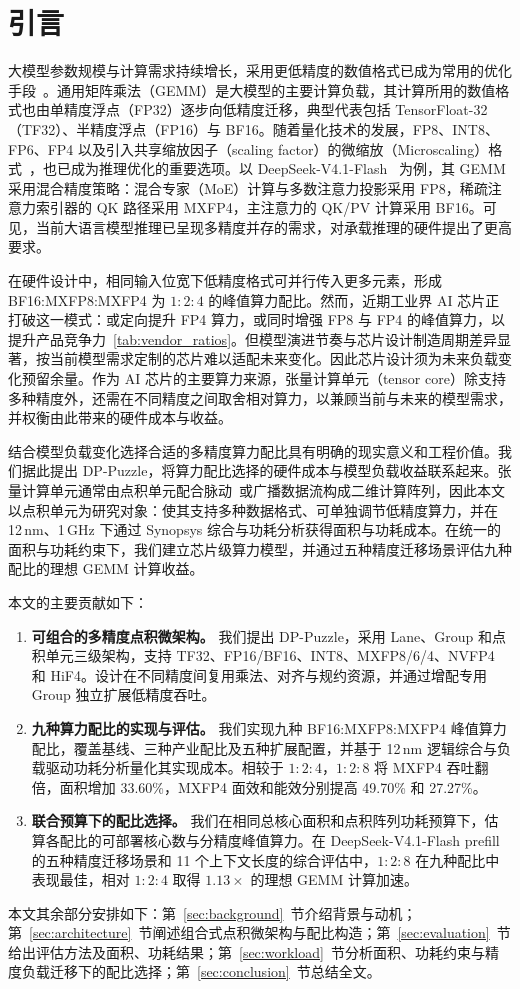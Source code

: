 \section{引言}
\label{sec:introduction}
大模型参数规模与计算需求持续增长，采用更低精度的数值格式已成为常用的优化手段~\cite{deepseekv3}。通用矩阵乘法（GEMM）是大模型的主要计算负载，其计算所用的数值格式也由单精度浮点（FP32）逐步向低精度迁移，典型代表包括 TensorFloat-32（TF32）、半精度浮点（FP16）与 BF16。随着量化技术的发展，FP8、INT8、FP6、FP4 以及引入共享缩放因子（scaling factor）的微缩放（Microscaling）格式~\cite{ocpmx2023}，也已成为推理优化的重要选项。以 DeepSeek-V4.1-Flash~\cite{deepseekv41source} 为例，其 GEMM 采用混合精度策略：混合专家（MoE）计算与多数注意力投影采用 FP8，稀疏注意力索引器的 QK 路径采用 MXFP4，主注意力的 QK/PV 计算采用 BF16。可见，当前大语言模型推理已呈现多精度并存的需求，对承载推理的硬件提出了更高要求。

在硬件设计中，相同输入位宽下低精度格式可并行传入更多元素，形成 BF16:MXFP8:MXFP4 为 $1:2:4$ 的峰值算力配比。然而，近期工业界 AI 芯片正打破这一模式：或定向提升 FP4 算力，或同时增强 FP8 与 FP4 的峰值算力，以提升产品竞争力~\ref{tab:vendor_ratios}。但模型演进节奏与芯片设计制造周期差异显著，按当前模型需求定制的芯片难以适配未来变化。因此芯片设计须为未来负载变化预留余量。作为 AI 芯片的主要算力来源，张量计算单元（tensor core）除支持多种精度外，还需在不同精度之间取舍相对算力，以兼顾当前与未来的模型需求，并权衡由此带来的硬件成本与收益。

结合模型负载变化选择合适的多精度算力配比具有明确的现实意义和工程价值。我们据此提出 DP-Puzzle，将算力配比选择的硬件成本与模型负载收益联系起来。张量计算单元通常由点积单元配合脉动~\cite{jouppi2017tpu}或广播数据流构成二维计算阵列，因此本文以点积单元为研究对象：使其支持多种数据格式、可单独调节低精度算力，并在 12\,nm、1\,GHz 下通过 Synopsys 综合与功耗分析获得面积与功耗成本。在统一的面积与功耗约束下，我们建立芯片级算力模型，并通过五种精度迁移场景评估九种配比的理想 GEMM 计算收益。


本文的主要贡献如下：
\begin{enumerate}
\item \textbf{可组合的多精度点积微架构。} 我们提出 DP-Puzzle，采用 Lane、Group 和点积单元三级架构，支持 TF32、FP16/BF16、INT8、MXFP8/6/4、NVFP4 和 HiF4。设计在不同精度间复用乘法、对齐与规约资源，并通过增配专用 Group 独立扩展低精度吞吐。
\item \textbf{九种算力配比的实现与评估。} 我们实现九种 BF16:MXFP8:MXFP4 峰值算力配比，覆盖基线、三种产业配比及五种扩展配置，并基于 12\,nm 逻辑综合与负载驱动功耗分析量化其实现成本。相较于 \mbox{$1:2:4$}，\mbox{$1:2:8$} 将 MXFP4 吞吐翻倍，面积增加 33.60\%，MXFP4 面效和能效分别提高 49.70\% 和 27.27\%。
\item \textbf{联合预算下的配比选择。} 我们在相同总核心面积和点积阵列功耗预算下，估算各配比的可部署核心数与分精度峰值算力。在 DeepSeek-V4.1-Flash prefill 的五种精度迁移场景和 11 个上下文长度的综合评估中，\mbox{$1:2:8$} 在九种配比中表现最佳，相对 \mbox{$1:2:4$} 取得 $1.13\times$ 的理想 GEMM 计算加速。
\end{enumerate}

本文其余部分安排如下：第~\ref{sec:background}~节介绍背景与动机；第~\ref{sec:architecture}~节阐述组合式点积微架构与配比构造；第~\ref{sec:evaluation}~节给出评估方法及面积、功耗结果；第~\ref{sec:workload}~节分析面积、功耗约束与精度负载迁移下的配比选择；第~\ref{sec:conclusion}~节总结全文。

